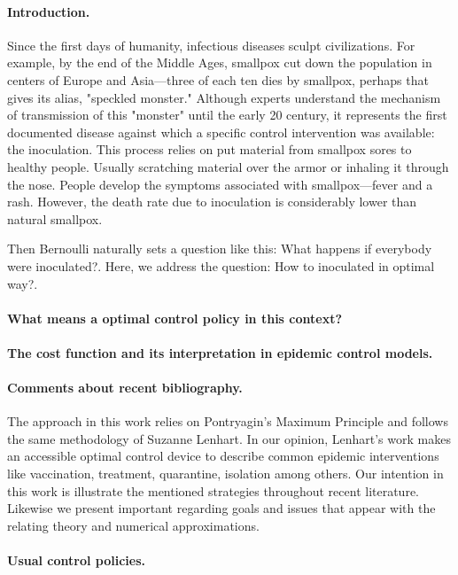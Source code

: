 
\paragraph{Introduction.}
  Since the first days of humanity, infectious diseases sculpt civilizations. 
For example, by the end of the Middle Ages, smallpox cut down the 
population in centers of Europe and Asia---three of  each ten dies by smallpox, 
perhaps that gives its alias, "speckled monster."  Although experts understand
the mechanism of transmission of this  "monster" until the early 20  century, it
represents the first documented disease
\citep[][]{bernoulli1760essai, bradley1971smallpox, Foppa2017}
against which a specific control intervention was available: the inoculation.
This process relies on put material from smallpox sores to healthy people. 
Usually scratching material over the armor or inhaling it through the nose. 
People develop the symptoms associated with smallpox---fever and a rash.
However, the death rate due to inoculation is considerably lower than natural
smallpox.

  Then Bernoulli naturally sets a question like this: What happens
if everybody were inoculated?. Here, we address the question: How to 
inoculated in optimal way?.

\paragraph{What means a optimal control policy in this context?}

\paragraph{The cost function and its interpretation in epidemic control models.}

\paragraph{Comments about recent bibliography.}
  The approach in this work relies on Pontryagin’s Maximum Principle
\cite{} and follows the same methodology of Suzanne Lenhart.
In our opinion, Lenhart's work makes an accessible optimal control device to
describe common epidemic interventions like vaccination, treatment, 
quarantine, isolation among others. Our intention in this work is illustrate 
the mentioned strategies throughout recent literature. Likewise we present 
important regarding goals and issues that appear with the relating theory and 
numerical approximations.
\paragraph{Usual control policies.}
